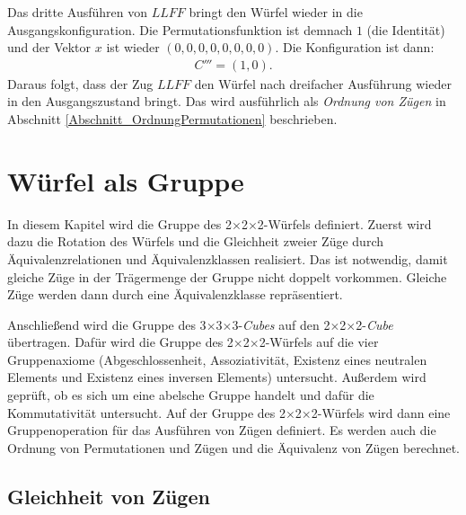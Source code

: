 \documentclass[12pt,a4paper, usenames, dvipsnames]{article}
\theoremstyle{mystyle}
\theoremstyle{definition}
\newcommand{\Ttwo}{2$\times$2$\times$2-}
\newcommand{\Tthree}{3$\times$3$\times$3-}
\begin{document}
Das dritte Ausführen von $LLFF$ bringt den Würfel wieder in die Ausgangskonfiguration. Die Permutationsfunktion ist demnach $1$ (die Identität) und der Vektor $x$ ist wieder $(0,0,0,0,0,0,0,0)$. Die Konfiguration ist dann:
\begin{align*}
C''' = (1,0).
\end{align*}
Daraus folgt, dass der Zug $LLFF$ den Würfel nach dreifacher Ausführung wieder in den Ausgangszustand bringt. Das wird ausführlich als \textit{Ordnung von Zügen} in Abschnitt \ref{Abschnitt_OrdnungPermutationen} beschrieben.

%
%
%
%
%
%
%
%
%
%
%
%
%
%

\newpage
\section{Würfel als Gruppe}

\label{Kapitel_WürfelAlsGruppe}

In diesem Kapitel wird die Gruppe des \Ttwo Würfels definiert. Zuerst wird dazu die Rotation des Würfels und die Gleichheit zweier Züge durch Äquivalenz\-relationen und Äquivalenzklassen realisiert. Das ist notwendig, damit gleiche Züge in der Trägermenge der Gruppe nicht doppelt vorkommen. Gleiche Züge werden dann durch eine Äquivalenzklasse repräsentiert. 

Anschließend wird die Gruppe des \Tthree \textit{Cubes} \cite{JC} auf den \Ttwo \textit{Cube} übertragen. 
Dafür wird die Gruppe des \Ttwo Würfels auf die vier Gruppenaxiome (Abgeschlossenheit, Assoziativität, Existenz eines neutralen Elements und Existenz eines inversen Elements) untersucht. Außerdem wird geprüft, ob es sich um eine abelsche Gruppe handelt und dafür die Kommutativität untersucht. Auf der Gruppe des \Ttwo Würfels wird dann eine Gruppenoperation für das Ausführen von Zügen definiert. Es werden auch die Ordnung von Permutationen und Zügen und die Äquivalenz von Zügen berechnet.



%
%
%
%
%
%
%
%
%
%
%
%
%
%
%
%
%
%
%

\subsection{Gleichheit von Zügen} 
\end{document}
